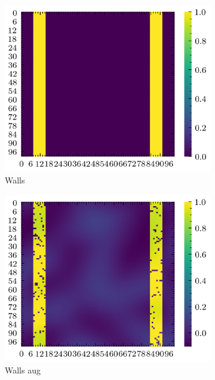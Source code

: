 \documentclass[../document.tex]{subfiles}
\begin{document}
\begin{figure}[H]
    \centering
        \begin{subfigure}[b]{0.23\textwidth}
            \includegraphics[width=\textwidth]{../img/data-aug/2d/wall.png}
            \caption{Walls}
        \end{subfigure}
        \begin{subfigure}[b]{0.23\linewidth}
            \includegraphics[width=\textwidth]{../img/data-aug/2d/wall-aug.png}
            \caption{Walls aug}
        \end{subfigure}    
        \begin{subfigure}[b]{0.23\textwidth}

\end{subfigure}
\end{figure}
\end{document}
